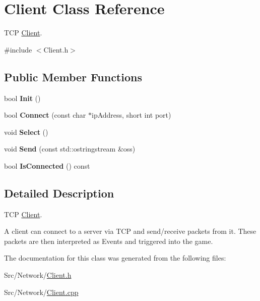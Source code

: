 \hypertarget{classClient}{\section{Client Class Reference}
\label{classClient}
}


T\-C\-P \hyperlink{classClient}{Client}.  




{\ttfamily \#include $<$Client.\-h$>$}

\subsection*{Public Member Functions}
\begin{DoxyCompactItemize}
\item 
\hypertarget{classClient_a280e1e9db34932c199494ec113c64f44}{bool {\bfseries Init} ()}\label{classClient_a280e1e9db34932c199494ec113c64f44}

\item 
\hypertarget{classClient_a372835c53864d6bfa2c31ab024ec005d}{bool {\bfseries Connect} (const char $\ast$ip\-Address, short int port)}\label{classClient_a372835c53864d6bfa2c31ab024ec005d}

\item 
\hypertarget{classClient_a9d507a3a9307f1d5b15f081011256aca}{void {\bfseries Select} ()}\label{classClient_a9d507a3a9307f1d5b15f081011256aca}

\item 
\hypertarget{classClient_afdbe84352d156fe66ec95f7792976123}{void {\bfseries Send} (const std\-::ostringstream \&oss)}\label{classClient_afdbe84352d156fe66ec95f7792976123}

\item 
\hypertarget{classClient_aa698e7ddf5ca25630dcc3c56631dc776}{bool {\bfseries Is\-Connected} () const }\label{classClient_aa698e7ddf5ca25630dcc3c56631dc776}

\end{DoxyCompactItemize}


\subsection{Detailed Description}
T\-C\-P \hyperlink{classClient}{Client}. 

A client can connect to a server via T\-C\-P and send/receive packets from it. These packets are then interpreted as Events and triggered into the game. 

The documentation for this class was generated from the following files\-:\begin{DoxyCompactItemize}
\item 
Src/\-Network/\hyperlink{Client_8h}{Client.\-h}\item 
Src/\-Network/\hyperlink{Client_8cpp}{Client.\-cpp}\end{DoxyCompactItemize}
